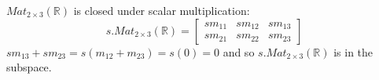 \documentclass{article}
\begin{document}
$Mat_{2\times 3}(\mathbb{R})$ is closed under scalar multiplication:
$$s . Mat_{2\times 3}(\mathbb{R}) = \left[\begin{array}{ccc} sm_{11} & sm_{12} & sm_{13} \\  sm_{21} & sm_{22} & sm_{23}\end{array}\right]$$
$sm_{13}+sm_{23}= s(m_{12}+m_{23}) = s(0) = 0$ and so $s . Mat_{2\times 3}(\mathbb{R})$ is in the subspace.\newline
\section{}
\end{document}
